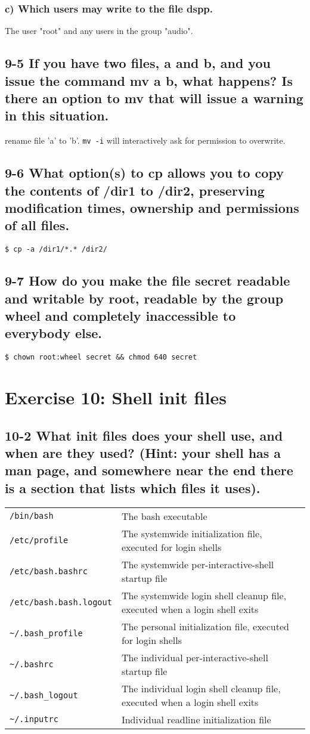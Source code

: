 \subsubsection{c) Which users may write to the file dspp.}
The user "root" and any users in the group "audio".

\subsection{9-5 If you have two files, a and b, and you issue the command mv a b, what happens? Is there an option to mv that will issue a warning in this situation.}
rename file 'a' to 'b'. \verb=mv -i= will interactively ask for permission to overwrite.

\subsection{9-6 What option(s) to cp allows you to copy the contents of /dir1 to /dir2, preserving modification times, ownership and permissions of all files.}
\verb=$ cp -a /dir1/*.* /dir2/=

\subsection{9-7 How do you make the file secret readable and writable by root, readable by the group wheel and completely inaccessible to everybody else.}
\verb=$ chown root:wheel secret && chmod 640 secret=

\section{Exercise 10: Shell init files}
\subsection{10-2 What init files does your shell use, and when are they used? (Hint: your shell has a man page, and somewhere near the end there is a section that lists which files it uses).}

\begin{tabular}{ll}
\verb=/bin/bash= &
	The bash executable\\
\verb=/etc/profile= &
	The systemwide initialization file, executed for login shells\\
\verb=/etc/bash.bashrc= &
	The systemwide per-interactive-shell startup file\\
\verb=/etc/bash.bash.logout= &
	The systemwide login shell cleanup file, executed when a login shell exits\\
\verb=~/.bash_profile= &
	The personal initialization file, executed for login shells\\
\verb=~/.bashrc= &
	The individual per-interactive-shell startup file\\
\verb=~/.bash_logout= &
	The individual login shell cleanup file, executed when a login shell exits\\
\verb=~/.inputrc=&
	Individual readline initialization file
\end{tabular}

